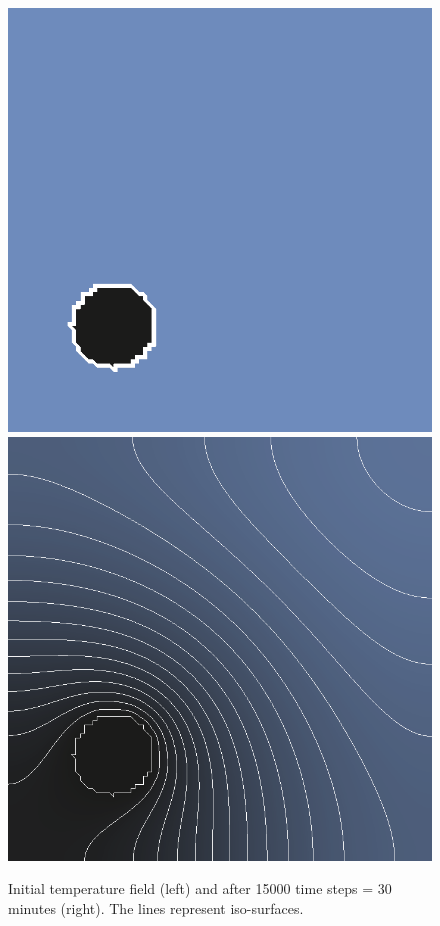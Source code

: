 \begin{figure}[!htb]
  \centering
  \includegraphics[width=.4\textwidth]{figures/hot-point-1}
  \hfill
  \includegraphics[width=.4\textwidth]{figures/hot-point-2}
  \caption{Initial temperature field (left) and after 15000 time steps = 30 minutes (right). The lines represent iso-surfaces.}
  \label{fig:htm:explicit:dynamic}
\end{figure}
